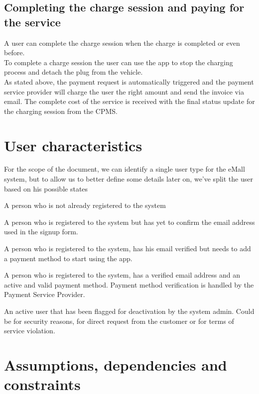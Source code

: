 \subsection{Completing the charge session and paying for the service}
A user can complete the charge session when the charge is completed or even before.\\
To complete a charge session the user can use the app to stop the charging process and detach the plug from the vehicle.\\
As stated above, the payment request is automatically triggered and the payment service provider will charge the user the right amount and send the invoice via email. The complete cost of the service is received with the final status update for the charging session from the CPMS.

\section{User characteristics}
For the scope of the document, we can identify a single user type for the eMall system, but to allow us to better define some details later on, we've split the user based on his possible states

\begin{enumerate}
	A person who is not already registered to the system
	
	A person who is registered to the system but has yet to confirm the email address used in the signup form.
	
	A person who is registered to the system, has his email verified but needs to add a payment method to start using the app.

	A person who is registered to the system, has a verified email address and an active and valid payment method. Payment method verification is handled by the Payment Service Provider.
	
	An active user that has been flagged for deactivation by the system admin. Could be for security reasons, for direct request from the customer or for terms of service violation.

\end{enumerate}

\section{Assumptions, dependencies and constraints}


